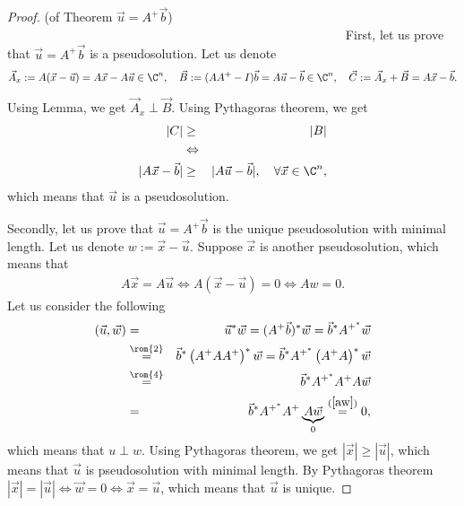     \begin{proof}(of Theorem $\vec{u} = A^+\vec{b}$)~ ~ ~ ~ ~ ~ ~~ ~ ~ ~ ~ ~ ~~ ~ ~ ~ ~ ~ ~~ ~ ~ ~ ~ ~ ~~ ~ ~ ~ ~ ~ ~~ ~ ~ ~ ~ ~ ~~ ~ ~ ~ ~ ~ ~~ ~ ~ ~ ~ ~ ~~ ~ ~ ~ ~ ~ ~
        First, let us prove that $\vec{u} = A^+\vec{b}$ is a pseudosolution. Let us denote
        $$
            \vec{A}_x:= A(\vec{x}-\vec{u})=A\vec{x}-A\vec{u}\in \C^n,\quad
            \vec{B}  := (AA^+-I)\vec{b}  = A\vec{u}-\vec{b}\in \C^n,\quad
            \vec{C}  := \vec{A}_x+\vec{B} =A\vec{x}-\vec{b}.
        $$
        
         Using Lemma, we get $\vec{A}_x\perp\vec{B}$. Using Pythagoras theorem, we get
         \begin{eqnarray}
            |C|&\ge&|B|\nonumber\\
            &\Leftrightarrow&\nonumber\\ 
            |A\vec{x}-\vec{b}|&\ge&|A\vec{u}-\vec{b}|,\quad \forall \vec{x}\in \C^n,\nonumber
         \end{eqnarray}
         which means that $\vec{u}$ is a pseudosolution.
    
        Secondly, let us prove that $\vec{u} = A^+\vec{b}$ is the unique pseudosolution with minimal length.  Let us denote $w:=\vec{x}-\vec{u}$. Suppose $\vec{x}$ is another pseudosolution, which means that 
        \begin{eqnarray}   
            A\vec{x}=A\vec{u}
            \Leftrightarrow A(\vec{x}-\vec{u})=0
            \Leftrightarrow Aw=0.\label{aw}
        \end{eqnarray}
        Let us consider the following
        \begin{eqnarray}
          \left(\vec{u}, \vec{w}\right) 
          &=& \vec{u}^* \vec{w} 
          = (A^+\vec{b})^* \vec{w} 
          = \vec{b}^*A^{+^*} \vec{w}\nonumber\\
          &\overset{\rom{2}}{=}& \vec{b}^*\left(A^+AA^+\right)^*\vec{w}  
          = \vec{b}^*A^{+^*}\left(A^+A\right)^*\vec{w}  \nonumber\\
          &\overset{\rom{4}}{=}& \vec{b}^*A^{+^*}A^+A\vec{w}\nonumber\\
          &=&\vec{b}^*A^{+^*}A^+\underbrace{A\vec{w}}_{0} \overset{(\ref{aw})}{=} 0,\nonumber
        \end{eqnarray}
        which means that $u\perp w$. Using Pythagoras theorem, we get $|\vec{x}|\ge|\vec{u}|$, which means that $\vec{u}$ is pseudosolution with minimal length. By Pythagoras theorem $|\vec{x}|=|\vec{u}|\Leftrightarrow\vec{w}=0\Leftrightarrow \vec{x}=\vec{u}$, which means that $\vec{u}$ is unique.
    \end{proof}
